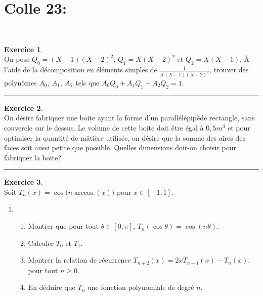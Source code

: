 \documentclass[a4paper,10pt]{article}
\theoremstyle{definition}
\theoremstyle{definition}
\newtheorem{exo}{Exercice}
\begin{document}
\section*{Colle 23:}\hfill\\%
\begin{minipage}{1\linewidth}
	\begin{minipage}[t]{0.48\linewidth}
		\raggedright
		
		\begin{exo}\quad\\
			
			On pose $Q_0=(X-1)(X-2)^2$, $Q_1=X(X-2)^2$ et $Q_2=X(X-1)$. 
			\`A l'aide de la décomposition en éléments simples de $\frac{1}{X(X-1)(X-2)^2}$, 
			trouver des polynômes $A_0,\ A_1,\ A_2$ tels que $A_0Q_0+A_1Q_1+A_2Q_2=1$.
			
			\centering
			\rule{1\linewidth}{0.6pt}
		\end{exo}
	
	
	\begin{exo}\quad\\[0.2cm] %
		On désire fabriquer une boite ayant la forme d'un parallélépipède rectangle, sans couvercle sur le dessus. Le volume de cette boite doit être égal à $0,5m^3$ et pour optimiser la quantité de mâtière utilisée, on désire que la somme des aires des faces soit aussi petite que possible. Quelles dimensions doit-on choisir pour fabriquer la boite?
		
		\centering
		\rule{1\linewidth}{0.6pt}
	\end{exo}
		
	\end{minipage}	
	\hfill\vrule\hfill
	\begin{minipage}[t]{0.48\linewidth}
		\raggedright

\begin{exo}\quad\\
	Soit $T_n(x)=\cos\big(n \arccos(x)\big)$ pour $x\in [-1,1]$.
	\begin{enumerate}
		\item 
		\begin{enumerate}
			\item Montrer que pour tout $\theta\in[0,\pi]$, $T_n(\cos\theta)=\cos(n\theta)$.
			\item Calculer $T_0$ et $T_1$.
			\item Montrer la relation de récurrence $T_{n+2}(x) = 2xT_{n+1}(x)-T_n(x)$, pour tout $n \ge0$.
			\item En déduire que $T_n$ une fonction polynomiale de degré $n$.
		\end{enumerate}
		

\end{enumerate}
\end{exo}
\end{minipage}
\end{minipage}
\end{document}
